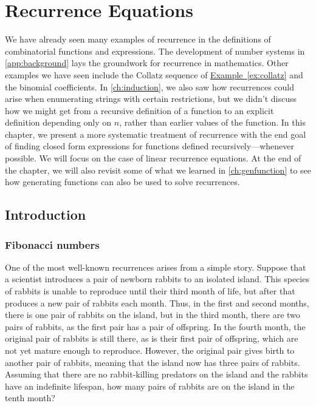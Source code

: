 
\chapter{Recurrence Equations}\label{ch:recurrence}

We have already seen many examples of recurrence in the definitions of
combinatorial functions and expressions. The development of number
systems in \autoref{app:background} lays the groundwork for recurrence in
mathematics. Other examples we have seen include the Collatz sequence
of \hyperref[ex:collatz]{Example~\ref*{ex:collatz}} and the binomial
coefficients. In \autoref{ch:induction}, we also saw how recurrences
could arise when enumerating strings with certain restrictions, but we
didn't discuss how we might get from a recursive definition of a
function to an explicit definition depending only on $n$, rather than
earlier values of the function. In this chapter, we present a more
systematic treatment of recurrence with the end goal of finding closed
form expressions for functions defined recursively---whenever
possible.  We will focus on the case of linear recurrence
equations. At the end of the chapter, we will also revisit some of
what we learned in \autoref{ch:genfunction} to see how generating
functions can also be used to solve recurrences.

\section{Introduction}\label{s:recurrence:intro}

\subsection{Fibonacci numbers}\label{s:recurrence:intro:fib}
One of the most well-known recurrences arises from a simple
story. Suppose that a scientist introduces a pair of newborn rabbits
to an isolated island. This species of rabbits is unable to reproduce
until their third month of life, but after that produces a new pair of
rabbits each month. Thus, in the first and second months, there is one
pair of rabbits on the island, but in the third month, there are two
pairs of rabbits, as the first pair has a pair of offspring. In the
fourth month, the original pair of rabbits is still there, as is their
first pair of offspring, which are not yet mature enough to
reproduce. However, the original pair gives birth to another pair of
rabbits, meaning that the island now has three pairs of
rabbits. Assuming that there are no rabbit-killing predators on the
island and the rabbits have an indefinite lifespan, how many pairs of
rabbits are on the island in the tenth month?

